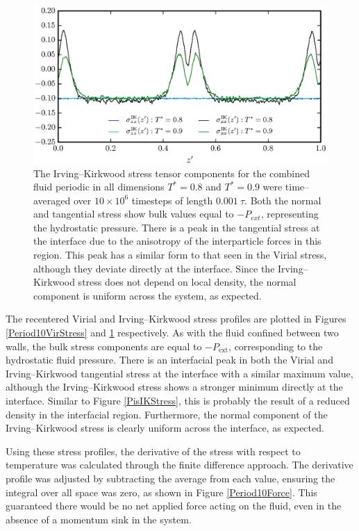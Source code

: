 \begin{figure}[h!]
\centering
\includegraphics[scale=1.0]{Period10IKStress}
\caption{The Irving--Kirkwood stress tensor components for the combined fluid periodic in all dimensions $T^{*} = 0.8$ and $T^{*} = 0.9$ were time--averaged over $10 \times 10^{6}$ timesteps of length $0.001\ \tau$.
Both the normal and tangential stress show bulk values equal to $-P_{ext}$, representing the hydrostatic pressure.
There is a peak in the tangential stress at the interface due to the anisotropy of the interparticle forces in this region.
This peak has a similar form to that seen in the Virial stress, although they deviate directly at the interface.
Since the Irving--Kirkwood stress does not depend on local density, the normal component is uniform across the system, as expected.
}
\label{Period10IKStress}
\end{figure}
The recentered Virial and Irving--Kirkwood stress profiles are plotted in Figures \ref{Period10VirStress} and \ref{Period10IKStress} respectively.
As with the fluid confined between two walls, the bulk stress components are equal to $-P_{\mathrm{ext}}$, corresponding to the hydrostatic fluid pressure.
There is an interfacial peak in both the Virial and Irving--Kirkwood tangential stress at the interface with a similar maximum value, although the Irving--Kirkwood stress shows a stronger minimum directly at the interface.
Similar to Figure \ref{PisIKStress}, this is probably the result of a reduced density in the interfacial region.
Furthermore, the normal component of the Irving--Kirkwood stress is clearly uniform across the interface, as expected.

\FloatBarrier
Using these stress profiles, the derivative of the stress with respect to temperature was calculated through the finite difference approach.
The derivative profile was adjusted by subtracting the average from each value, ensuring the integral over all space was zero, as shown in Figure \ref{Period10Force}.
This guaranteed there would be no net applied force acting on the fluid, even in the absence of a momentum sink in the system.

